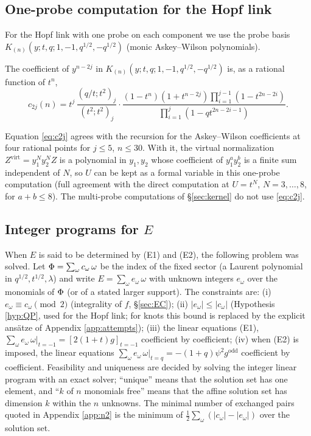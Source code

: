 \subsection{One-probe computation for the Hopf link}\label{app:virtual}
For the Hopf link with one probe on each component we use the probe basis $K_{(n)}(y; t, q; 1, -1, q^{1/2}, -q^{1/2})$ (monic Askey--Wilson polynomials).
\begin{conjecture}\label{conj:c2j}
The coefficient of $y^{n-2j}$ in $K_{(n)}(y; t, q; 1, -1, q^{1/2}, -q^{1/2})$ is, as a rational function of $t^n$,
\begin{equation}\label{eq:c2j}
c_{2j}(n) = t^j\, \frac{(q/t; t^2)_j}{(t^2; t^2)_j}\cdot\frac{(1 - t^n)(1 + t^{n-2j})\prod_{i=1}^{j-1}(1 - t^{2n-2i})}{\prod_{i=1}^{j}(1 - qt^{2n-2i-1})} .
\end{equation}
\end{conjecture}
Equation \eqref{eq:c2j} agrees with the recursion for the Askey--Wilson coefficients at four rational points for $j \le 5$, $n \le 30$. With it, the virtual normalization $Z^{\mathrm{virt}} = y_1^N y_2^N Z$ is a polynomial in $y_1, y_2$ whose coefficient of $y_1^a y_2^b$ is a finite sum independent of $N$, so $U$ can be kept as a formal variable in this one-probe computation (full agreement with the direct computation at $U = t^N$, $N = 3, \dots, 8$, for $a + b \le 8$). The multi-probe computations of \S\ref{sec:kernel} do not use \eqref{eq:c2j}.

\subsection{Integer programs for \texorpdfstring{$E$}{E}}\label{app:ilp}
When $E$ is said to be determined by (E1) and (E2), the following problem was solved. Let $\Phi = \sum_\omega c_\omega\,\omega$ be the index of the fixed sector (a Laurent polynomial in $q^{1/2}, t^{1/2}, \lambda$) and write $E = \sum_\omega e_\omega\,\omega$ with unknown integers $e_\omega$ over the monomials of $\Phi$ (or of a stated larger support). The constraints are: (i) $e_\omega \equiv c_\omega \pmod 2$ (integrality of $f$, \S\ref{sec:EC}); (ii) $|e_\omega| \le |c_\omega|$ (Hypothesis \ref{hyp:QP}, used for the Hopf link; for knots this bound is replaced by the explicit ans\"atze of Appendix \ref{app:attempts}); (iii) the linear equations (E1), $\sum_\omega e_\omega\,\omega|_{t=-1} = [2(1+t)g]_{t=-1}$ coefficient by coefficient; (iv) when (E2) is imposed, the linear equations $\sum_\omega e_\omega\,\omega|_{t=q} = -(1+q)\psi^2 g^{\mathrm{odd}}$ coefficient by coefficient. Feasibility and uniqueness are decided by solving the integer linear program with an exact solver; ``unique'' means that the solution set has one element, and ``$k$ of $n$ monomials free'' means that the affine solution set has dimension $k$ within the $n$ unknowns. The minimal number of exchanged pairs quoted in Appendix \ref{app:n2} is the minimum of $\tfrac12\sum_\omega(|c_\omega| - |e_\omega|)$ over the solution set.
